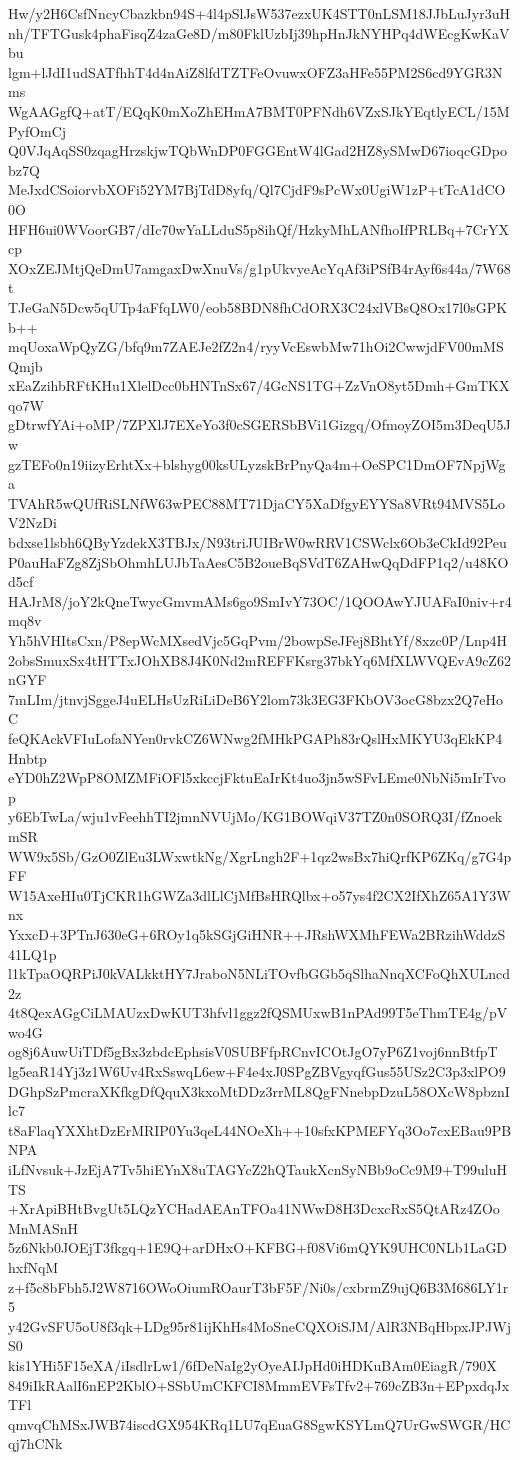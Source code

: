 Hw/y2H6CsfNncyCbazkbn94S+4l4pSlJsW537ezxUK4STT0nLSM18JJbLuJyr3uH
nh/TFTGusk4phaFisqZ4zaGe8D/m80FklUzbIj39hpHnJkNYHPq4dWEcgKwKaVbu
lgm+lJdI1udSATfhhT4d4nAiZ8lfdTZTFeOvuwxOFZ3aHFe55PM2S6cd9YGR3Nms
WgAAGgfQ+atT/EQqK0mXoZhEHmA7BMT0PFNdh6VZxSJkYEqtlyECL/15MPyfOmCj
Q0VJqAqSS0zqagHrzskjwTQbWnDP0FGGEntW4lGad2HZ8ySMwD67ioqcGDpobz7Q
MeJxdCSoiorvbXOFi52YM7BjTdD8yfq/Ql7CjdF9sPcWx0UgiW1zP+tTcA1dCO0O
HFH6ui0WVoorGB7/dIc70wYaLLduS5p8ihQf/HzkyMhLANfhoIfPRLBq+7CrYXcp
XOxZEJMtjQeDmU7amgaxDwXnuVs/g1pUkvyeAcYqAf3iPSfB4rAyf6s44a/7W68t
TJeGaN5Dcw5qUTp4aFfqLW0/eob58BDN8fhCdORX3C24xlVBsQ8Ox17l0sGPKb++
mqUoxaWpQyZG/bfq9m7ZAEJe2fZ2n4/ryyVcEswbMw71hOi2CwwjdFV00mMSQmjb
xEaZzihbRFtKHu1XlelDcc0bHNTnSx67/4GcNS1TG+ZzVnO8yt5Dmh+GmTKXqo7W
gDtrwfYAi+oMP/7ZPXlJ7EXeYo3f0cSGERSbBVi1Gizgq/OfmoyZOI5m3DeqU5Jw
gzTEFo0n19iizyErhtXx+blshyg00ksULyzskBrPnyQa4m+OeSPC1DmOF7NpjWga
TVAhR5wQUfRiSLNfW63wPEC88MT71DjaCY5XaDfgyEYYSa8VRt94MVS5LoV2NzDi
bdxse1lsbh6QByYzdekX3TBJx/N93triJUIBrW0wRRV1CSWclx6Ob3eCkId92Peu
P0auHaFZg8ZjSbOhmhLUJbTaAesC5B2oueBqSVdT6ZAHwQqDdFP1q2/u48KOd5cf
HAJrM8/joY2kQneTwycGmvmAMs6go9SmIvY73OC/1QOOAwYJUAFaI0niv+r4mq8v
Yh5hVHItsCxn/P8epWcMXsedVjc5GqPvm/2bowpSeJFej8BhtYf/8xzc0P/Lnp4H
2obsSmuxSx4tHTTxJOhXB8J4K0Nd2mREFFKsrg37bkYq6MfXLWVQEvA9cZ62nGYF
7mLIm/jtnvjSggeJ4uELHsUzRiLiDeB6Y2lom73k3EG3FKbOV3ocG8bzx2Q7eHoC
feQKAckVFIuLofaNYen0rvkCZ6WNwg2fMHkPGAPh83rQslHxMKYU3qEkKP4Hnbtp
eYD0hZ2WpP8OMZMFiOFl5xkccjFktuEaIrKt4uo3jn5wSFvLEme0NbNi5mIrTvop
y6EbTwLa/wju1vFeehhTI2jmnNVUjMo/KG1BOWqiV37TZ0n0SORQ3I/fZnoekmSR
WW9x5Sb/GzO0ZlEu3LWxwtkNg/XgrLngh2F+1qz2wsBx7hiQrfKP6ZKq/g7G4pFF
W15AxeHIu0TjCKR1hGWZa3dlLlCjMfBsHRQlbx+o57ys4f2CX2IfXhZ65A1Y3Wnx
YxxcD+3PTnJ630eG+6ROy1q5kSGjGiHNR++JRshWXMhFEWa2BRzihWddzS41LQ1p
l1kTpaOQRPiJ0kVALkktHY7JraboN5NLiTOvfbGGb5qSlhaNnqXCFoQhXULncd2z
4t8QexAGgCiLMAUzxDwKUT3hfvl1ggz2fQSMUxwB1nPAd99T5eThmTE4g/pVwo4G
og8j6AuwUiTDf5gBx3zbdcEphsisV0SUBFfpRCnvICOtJgO7yP6Z1voj6nnBtfpT
lg5eaR14Yj3z1W6Uv4RxSswqL6ew+F4e4xJ0SPgZBVgyqfGus55USz2C3p3xlPO9
DGhpSzPmcraXKfkgDfQquX3kxoMtDDz3rrML8QgFNnebpDzuL58OXcW8pbznIlc7
t8aFlaqYXXhtDzErMRIP0Yu3qeL44NOeXh++10sfxKPMEFYq3Oo7cxEBau9PBNPA
iLfNvsuk+JzEjA7Tv5hiEYnX8uTAGYcZ2hQTaukXcnSyNBb9oCc9M9+T99uluHTS
+XrApiBHtBvgUt5LQzYCHadAEAnTFOa41NWwD8H3DcxcRxS5QtARz4ZOoMnMASnH
5z6Nkb0JOEjT3fkgq+1E9Q+arDHxO+KFBG+f08Vi6mQYK9UHC0NLb1LaGDhxfNqM
z+f5c8bFbh5J2W8716OWoOiumROaurT3bF5F/Ni0s/cxbrmZ9ujQ6B3M686LY1r5
y42GvSFU5oU8f3qk+LDg95r81ijKhHs4MoSneCQXOiSJM/AlR3NBqHbpxJPJWjS0
kis1YHi5F15eXA/iIsdlrLw1/6fDeNaIg2yOyeAIJpHd0iHDKuBAm0EiagR/790X
849iIkRAalI6nEP2KblO+SSbUmCKFCI8MmmEVFsTfv2+769cZB3n+EPpxdqJxTFl
qmvqChMSxJWB74iscdGX954KRq1LU7qEuaG8SgwKSYLmQ7UrGwSWGR/HCqj7hCNk
